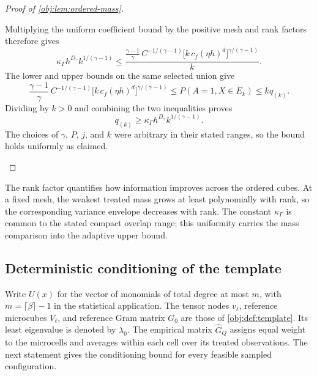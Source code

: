\documentclass[11pt]{article}
\begin{document}
\begin{proof}[Proof of \cref{obj:lem:ordered-mass}]
\begin{enumerate}
Multiplying the uniform coefficient bound by the positive mesh and rank factors therefore gives
\[
\kappa_\Gamma h^{D_\gamma}k^{1/(\gamma-1)}
\le
\frac{
\frac{\gamma-1}{\gamma}\,
C^{-1/(\gamma-1)}
\bigl[k\,c_f(\eta h)^d\bigr]^{\gamma/(\gamma-1)}
}{k}.
\]
The lower and upper bounds on the same selected union give
\[
\frac{\gamma-1}{\gamma}\,
C^{-1/(\gamma-1)}
\bigl[k\,c_f(\eta h)^d\bigr]^{\gamma/(\gamma-1)}
\le P(A=1,X\in E_k)
\le kq_{(k)}.
\]
Dividing by \(k>0\) and combining the two inequalities proves
\[
q_{(k)}
\ge
\kappa_\Gamma h^{D_\gamma}k^{1/(\gamma-1)}.
\]
The choices of \(\gamma\), \(P\), \(j\), and \(k\) were arbitrary in their stated ranges, so the bound holds uniformly as claimed.
\end{enumerate}
\end{proof}

The rank factor quantifies how information improves across the ordered cubes. At a fixed mesh, the weakest treated mass grows at least polynomially with rank, so the corresponding variance envelope decreases with rank. The constant \(\kappa_\Gamma\) is common to the stated compact overlap range; this uniformity carries the mass comparison into the adaptive upper bound.

\subsection{Deterministic conditioning of the template}

Write \(U(x)\) for the vector of monomials of total degree at most \(m\), with \(m=\lceil\beta\rceil-1\) in the statistical application. The tensor nodes \(v_\ell\), reference microcubes \(V_\ell\), and reference Gram matrix \(G_0\) are those of \cref{obj:def:template}. Its least eigenvalue is denoted by \(\lambda_0\). The empirical matrix \(\widehat G_Q\) assigns equal weight to the microcells and averages within each cell over its treated observations. The next statement gives the conditioning bound for every feasible sampled configuration.
\end{document}
